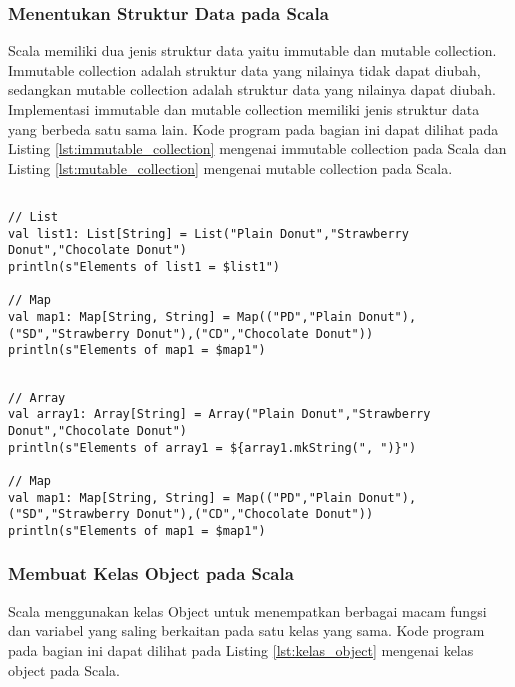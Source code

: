 \newpage
\subsubsection{Menentukan Struktur Data pada Scala}
Scala memiliki dua jenis struktur data yaitu immutable dan mutable collection. Immutable collection adalah struktur data yang nilainya tidak dapat diubah, sedangkan mutable collection adalah struktur data yang nilainya dapat diubah. Implementasi immutable dan mutable collection memiliki jenis struktur data yang berbeda satu sama lain. Kode program pada bagian ini dapat dilihat pada Listing \ref{lst:immutable_collection} mengenai immutable collection pada Scala dan Listing \ref{lst:mutable_collection} mengenai  mutable collection pada Scala.

\begin{lstlisting}[basicstyle=\ttfamily, frame=single,
	columns=fullflexible, keepspaces=true, breaklines=true, label=lst:immutable_collection, caption=Membuat immutable collection pada Scala]
	
// List
val list1: List[String] = List("Plain Donut","Strawberry Donut","Chocolate Donut")
println(s"Elements of list1 = $list1")

// Map
val map1: Map[String, String] = Map(("PD","Plain Donut"),("SD","Strawberry Donut"),("CD","Chocolate Donut"))
println(s"Elements of map1 = $map1")

\end{lstlisting}

\begin{lstlisting}[basicstyle=\ttfamily, frame=single,
	columns=fullflexible, keepspaces=true, breaklines=true, label=lst:mutable_collection, caption=Membuat mutable collection pada Scala]
	
// Array
val array1: Array[String] = Array("Plain Donut","Strawberry Donut","Chocolate Donut")
println(s"Elements of array1 = ${array1.mkString(", ")}")

// Map
val map1: Map[String, String] = Map(("PD","Plain Donut"),("SD","Strawberry Donut"),("CD","Chocolate Donut"))
println(s"Elements of map1 = $map1")

\end{lstlisting}

\subsubsection{Membuat Kelas Object pada Scala}
Scala menggunakan kelas Object untuk menempatkan berbagai macam fungsi dan variabel yang saling berkaitan pada satu kelas yang sama. Kode program pada bagian ini dapat dilihat pada Listing \ref{lst:kelas_object} mengenai kelas object pada Scala.

